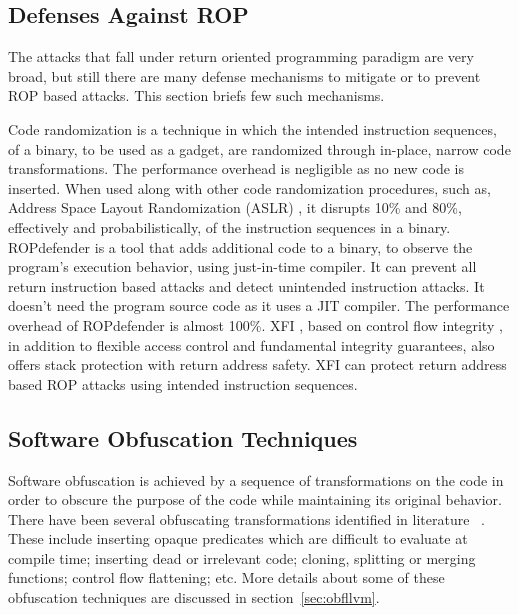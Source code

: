 \subsection {Defenses Against ROP}
The attacks that fall under return oriented programming paradigm are very 
broad, but still there are many defense mechanisms to mitigate or to prevent 
ROP based attacks. This section briefs few such mechanisms.

Code randomization \cite{pappas2012smashing} is a technique in which the 
intended instruction sequences, of a binary, to be used as a gadget, are 
randomized through in-place, narrow code transformations. The performance 
overhead is negligible as no new code is inserted. When used along with other 
code randomization procedures, such as, Address Space Layout Randomization 
(ASLR) \cite{shacham2004effectiveness}, it disrupts 10\% and 80\%, effectively 
and probabilistically, of the instruction sequences in a binary. 
ROPdefender \cite{davi2011ropdefender} is a tool that adds additional code to a 
binary, to observe the program's execution behavior, using just-in-time 
compiler. It can prevent all return instruction based attacks and detect 
unintended instruction attacks. It doesn't need the program source code as it 
uses a JIT compiler. The performance overhead of ROPdefender is almost 100\%. 
XFI \cite{erlingsson2006xfi}, based on control flow integrity 
\cite{abadi2005control}, in addition to flexible access control and 
fundamental integrity guarantees, also offers stack protection with return 
address safety. XFI can protect return address based ROP attacks using 
intended instruction sequences.


\subsection{Software Obfuscation Techniques}
Software obfuscation is achieved by a sequence of transformations on the code 
in order to obscure the purpose of the code while maintaining its original 
behavior. There have been several obfuscating transformations identified in 
literature ~\cite{nagra2009surreptitious, collberg2002watermarking}. These  
include inserting opaque predicates which are difficult to evaluate at compile 
time; inserting dead or irrelevant code; cloning, splitting or merging 
functions; control flow flattening; etc. More details about some of these 
obfuscation techniques are discussed in section~\ref{sec:obfllvm}.
